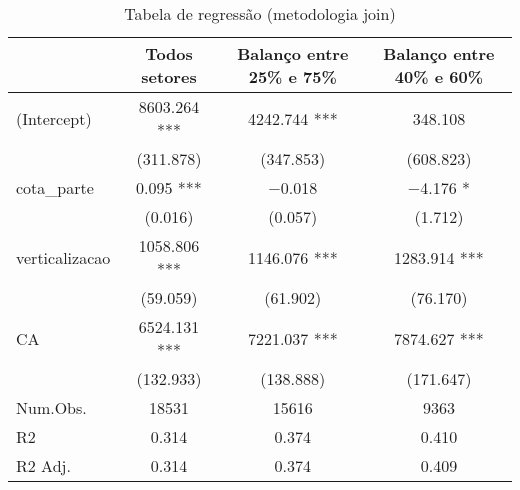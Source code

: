 \begin{table}
\centering
\caption{\label{tab:write_regression1}Tabela de regressão (metodologia join)}
\centering
\begin{tabular}[t]{lccc}
\toprule
  & Todos setores & Balanço entre 25\% e 75\% & Balanço entre 40\% e 60\%\\
\midrule
(Intercept) & \num{8603.264} *** & \num{4242.744} *** & \num{348.108}\\
 & (\num{311.878}) & (\num{347.853}) & (\num{608.823})\\
cota\_parte & \num{0.095} *** & \num{-0.018} & \num{-4.176} *\\
 & (\num{0.016}) & (\num{0.057}) & (\num{1.712})\\
verticalizacao & \num{1058.806} *** & \num{1146.076} *** & \num{1283.914} ***\\
 & (\num{59.059}) & (\num{61.902}) & (\num{76.170})\\
CA & \num{6524.131} *** & \num{7221.037} *** & \num{7874.627} ***\\
 & (\num{132.933}) & (\num{138.888}) & (\num{171.647})\\
\midrule
Num.Obs. & \num{18531} & \num{15616} & \num{9363}\\
R2 & \num{0.314} & \num{0.374} & \num{0.410}\\
R2 Adj. & \num{0.314} & \num{0.374} & \num{0.409}\\
\bottomrule
\end{tabular}
\end{table}
